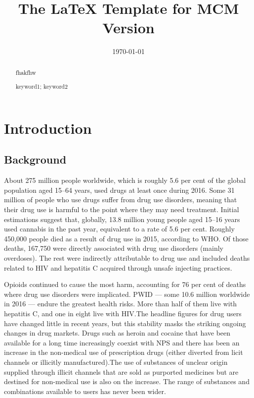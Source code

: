 \documentclass{mcmthesis}
\title{The \LaTeX{} Template for MCM Version \MCMversion}
\author{}
\date{\today}
\begin{document}
\begin{abstract}
	fhakfhw
	\begin{keywords}
		keyword1; keyword2
	\end{keywords}
\end{abstract}
\maketitle
\tableofcontents

\newpage
\section{Introduction}

\subsection{Background}
About 275 million people worldwide, which is roughly 5.6 per cent of the global population aged 15–64 years, used drugs at least once during 2016. Some 31 million of people who use drugs suffer from drug use disorders, meaning that their drug use is harmful to the point where they may need treatment. Initial estimations suggest that, globally, 13.8 million young people aged 15–16 years used cannabis in the past year, equivalent to a rate of 5.6 per cent. 
Roughly 450,000 people died as a result of drug use in 2015, according to WHO. Of those deaths, 167,750 were directly associated with drug use disorders (mainly overdoses). The rest were indirectly attributable to drug use and included deaths related to HIV and hepatitis C acquired through unsafe injecting practices.

Opioids continued to cause the most harm, accounting for 76 per cent of deaths where drug use disorders were implicated. PWID — some 10.6 million worldwide in 2016 — endure the greatest health risks. More than half of them live with hepatitis C, and one in eight live with HIV.The headline figures for drug users have changed little in recent years, but this stability masks the striking ongoing changes in drug markets. Drugs such as heroin and cocaine that have been available for a long time increasingly coexist with NPS and there has been an increase in the non-medical use of prescription drugs (either diverted from licit channels or illicitly manufactured).The use of substances of unclear origin supplied through illicit channels that are sold as purported medicines but are destined for non-medical use is also on the increase. The range of substances and combinations available to users has never been wider. 
\end{document}
